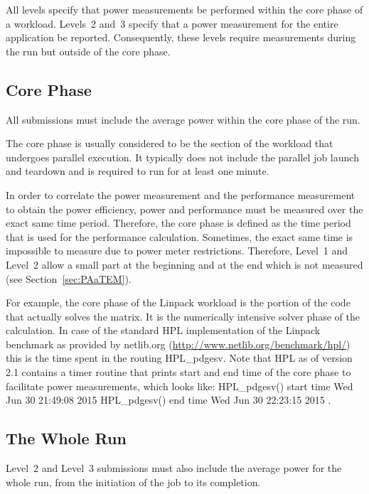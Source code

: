 All levels specify that power measurements be performed within the core phase of a workload.
Levels~2 and~3 specify that a power measurement for the entire application be reported.
Consequently, these levels require measurements during the run but outside of the core phase.

\subsection{Core Phase}
\label{sec:core_phase}

All submissions must include the average power within the core phase of the run.

The core phase is usually considered to be the section of the workload that undergoes parallel execution.
It typically does not include the parallel job launch and teardown and is required to run for at least one minute.

In order to correlate the power measurement and the performance measurement to obtain the power efficiency, power and performance must be measured over the exact same time period.
Therefore, the core phase is defined as the time period that is used for the performance calculation.
Sometimes, the exact same time is impossible to measure due to power meter restrictions.
Therefore, Level~1 and Level~2 allow a small part at the beginning and at the end which is not measured (see Section~\ref{sec:PAaTEM}).

For example, the core phase of the Linpack workload is the portion of the code that actually solves the matrix.
It is the numerically intensive solver phase of the calculation.
In case of the standard HPL implementation of the Linpack benchmark as provided by netlib.org (\url{http://www.netlib.org/benchmark/hpl/}) this is the time spent in the routing {\ttfamily HPL\_pdgesv}.
Note that HPL as of version 2.1 contains a timer routine that prints start and end time of the core phase to facilitate power measurements, which looks like:\newline
{\ttfamily
HPL\_pdgesv() start time Wed Jun 30 21:49:08 2015\newline
HPL\_pdgesv() end time Wed Jun 30 22:23:15 2015
}.

\subsection{The Whole Run}

Level~2 and Level~3 submissions must also include the average power for the whole run, from the initiation of the job to its completion.

